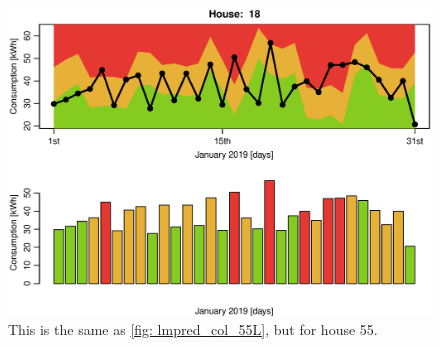 \begin{figure}[ht]
    \centering
    \includegraphics[scale=0.6]{../../../figures/Kplot18.eps}
    \caption{This is the same as \cref{fig: lmpred_col_55L}, but for house 55.}
    \label{fig: lmpred_col_18L}
\end{figure}
